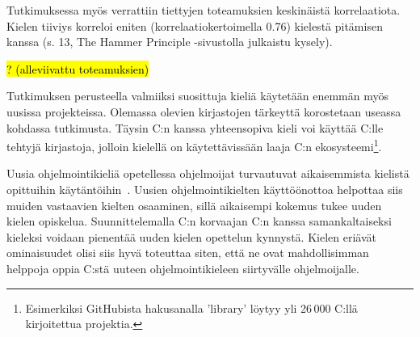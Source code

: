 Tutkimuksessa myös verrattiin tiettyjen toteamuksien keskinäistä korrelaatiota.
Kielen tiiviys korreloi eniten (korrelaatiokertoimella 0.76) kielestä pitämisen
kanssa (s. 13, The Hammer Principle -sivustolla julkaistu kysely).

\hl{? (alleviivattu toteamuksien)}


Tutkimuksen perusteella valmiiksi suosittuja kieliä käytetään enemmän myös
uusissa projekteissa. Olemassa olevien kirjastojen tärkeyttä korostetaan
useassa kohdassa tutkimusta. Täysin C:n kanssa yhteensopiva kieli voi käyttää
C:lle tehtyjä kirjastoja, jolloin kielellä on käytettävissään laaja C:n
ekosysteemi\footnote{Esimerkiksi GitHubista hakusanalla 'library' löytyy yli
26\,000 C:llä kirjoitettua projektia.}.

Uusia ohjelmointikieliä opetellessa ohjelmoijat turvautuvat aikaisemmista
kielistä opittuihin käytäntöihin~\citep{languagelearning}. Uusien
ohjelmointikielten käyttöönottoa helpottaa siis muiden vastaavien kielten
osaaminen, sillä aikaisempi kokemus tukee uuden kielen opiskelua.
Suunnittelemalla C:n korvaajan C:n kanssa samankaltaiseksi kieleksi voidaan
pienentää uuden kielen opettelun kynnystä. Kielen eriävät ominaisuudet olisi
siis hyvä toteuttaa siten, että ne ovat mahdollisimman helppoja oppia C:stä
uuteen ohjelmointikieleen siirtyvälle ohjelmoijalle.



